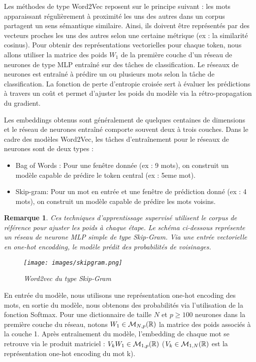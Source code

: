 \documentclass[12pt]{article}
\newtheorem{rmq}{Remarque}
\theoremstyle{definition}
\begin{document}
	Les méthodes de type Word2Vec \cite{word2vec} reposent sur le principe suivant : les mots apparaissant régulièrement à proximité les uns des autres dans un corpus partagent un sens sémantique similaire. Ainsi, ils doivent être représentés par des vecteurs proches les uns des autres selon une certaine métrique (ex : la similarité cosinus). Pour obtenir des représentations vectorielles pour chaque token, nous allons utiliser la matrice des poids $W_1$ de la première couche d'un réseau de neurones de type MLP entraîné sur des tâches de classification. Le réseaux de neurones est entraîné à prédire un ou plusieurs mots selon la tâche de classification. La fonction de perte d'entropie croisée sert à évaluer les prédictions à travers un coût et permet d'ajuster les poids du modèle via la rétro-propagation du gradient.
	
	Les embeddings obtenus sont généralement de quelques centaines de dimensions et le réseau de neurones entraîné comporte souvent deux à trois couches. Dans le cadre des modèles Word2Vec, les tâches d'entraînement pour le réseaux de neurones sont de deux types :
	\begin{itemize}
		\item Bag of Words : Pour une fenêtre donnée (ex : 9 mots), on construit un modèle  capable de prédire le token central (ex : 5eme mot). 
		\item Skip-gram: Pour un mot en entrée et une fenêtre de prédiction donné (ex : 4 mots), on construit un modèle capable de prédire les mots voisins.
	\end{itemize}

	\begin{rmq}
			Ces techniques d'apprentissage supervisé utilisent le corpus de référence pour ajuster les poids à chaque étape. Le schéma ci-dessous représente un réseau de neurone MLP simple de type Skip-Gram. Via une entrée vectorielle en one-hot encodding, le modèle prédit des probabilités de voisinages. \\
			
		
		\begin{figure*}[!h]
			\centering
			\texttt{[image: images/skipgram.png]}
			\caption{Word2vec du type Skip-Gram }
		\end{figure*}
	\end{rmq}
	

	
	
	En entrée du modèle, nous utilisons une représentation one-hot encoding des mots, en sortie du modèle, nous obtenons des probabilités via l'utilisation de la fonction Softmax. Pour une dictionnaire de taille $N$ et $p\geq 100$ neurones dans la première couche du réseau, notons $W_1 \in \mathcal{M}_{N,p}(\mathbb{R})$ la matrice des poids associés à la couche 1. Après entraînement du modèle, l'embedding de chaque mot se retrouve via le produit matriciel : $V_kW_1 \in \mathcal{M}_{1,p}(\mathbb{R})$ ($V_k\in\mathcal{M}_{1,N}(\mathbb{R})$ est la représentation one-hot encoding du mot k).  
	
\end{document}
